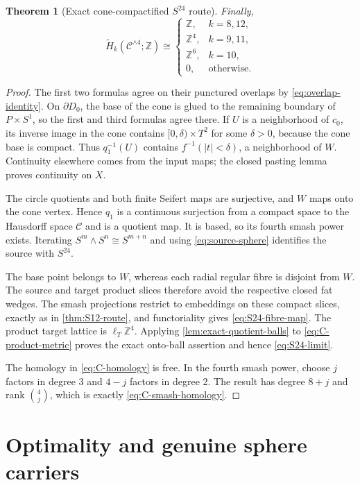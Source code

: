 \documentclass[11pt,letterpaper]{article}
\numberwithin{equation}{section}
\newtheorem{theorem}{Theorem}[section]
\theoremstyle{definition}
\theoremstyle{remark}
\newcommand{\Z}{\mathbb Z}
\begin{document}
\begin{theorem}[Exact cone-compactified $S^{24}$ route]
Finally,
\begin{equation}
 \widetilde H_k(\mathcal C^{\wedge4};\Z)\cong
 \begin{cases}
 \Z,&k=8,12,\\
 \Z^4,&k=9,11,\\
 \Z^6,&k=10,\\
 0,&\text{otherwise}.
 \end{cases}
 \label{eq:C-smash-homology}
\end{equation}
\end{theorem}

\begin{proof}
The first two formulas agree on their punctured overlaps by
\cref{eq:overlap-identity}.  On $\partial D_0$, the base of the cone is
glued to the remaining boundary of $P\times S^1$, so the first and third
formulas agree there.  If $U$ is a neighborhood of $c_0$, its inverse
image in the cone contains $[0,\delta)\times T^2$ for some $\delta>0$,
because the cone base is compact.  Thus $q_1^{-1}(U)$ contains
$f^{-1}(|t|<\delta)$, a neighborhood of $W$.  Continuity elsewhere comes
from the input maps; the closed pasting lemma proves continuity on $X$.

The circle quotients and both finite Seifert maps are surjective, and $W$
maps onto the cone vertex.  Hence $q_1$ is a continuous surjection from a
compact space to the Hausdorff space $\mathcal C$ and is a quotient map.
It is based, so its fourth smash power exists.  Iterating
$S^m\wedge S^n\cong S^{m+n}$ and using \cref{eq:source-sphere} identifies
the source with $S^{24}$.

The base point belongs to $W$, whereas each radial regular fibre is
disjoint from $W$.  The source and target product slices therefore avoid
the respective closed fat wedges.  The smash projections restrict to
embeddings on these compact slices, exactly as in
\cref{thm:S12-route}, and functoriality gives
\cref{eq:S24-fibre-map}.  The product target lattice is
$\ell_T\Z^4$.  Applying \cref{lem:exact-quotient-balls} to
\cref{eq:C-product-metric} proves the exact onto-ball assertion and hence
\cref{eq:S24-limit}.

The homology in \cref{eq:C-homology} is free.  In the fourth smash power,
choose $j$ factors in degree $3$ and $4-j$ factors in degree $2$.  The
result has degree $8+j$ and rank $\binom4j$, which is exactly
\cref{eq:C-smash-homology}.
\end{proof}

\section{Optimality and genuine sphere carriers}
\label{sec:optimal-sphere-carriers}
\end{document}
